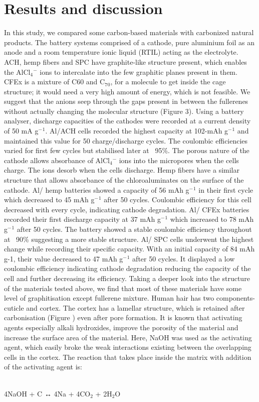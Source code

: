 \documentclass{article}
\begin{document}
\section{Results and discussion}

In this study, we compared some carbon-based materials with carbonized natural products. The battery systems comprised of a cathode, pure aluminium foil as an anode and a room temperature ionic liquid (RTIL) acting as the electrolyte. ACH, hemp fibers and SPC have graphite-like structure present, which enables the AlCl$_4{^-}$ ions to intercalate into the few graphitic planes present in them. CFEx is a mixture of C60 and C$_7{_0}$, for a molecule to get inside the cage structure; it would need a very high amount of energy, which is not feasible. We suggest that the anions seep through the gaps present in between the fullerenes without actually changing the molecular structure (Figure 3). 
Using a battery analyser, discharge capacities of the cathodes were recorded at a current density of 50 mA g$^-{^1}$. Al/ACH cells recorded the highest capacity at 102-mAh g$^-{^1}$ and maintained this value for 50 charge/discharge cycles. The coulombic efficiencies varied for first few cycles but stabilised later at ~95\%. The porous nature of the cathode allows absorbance of AlCl$_4{^-}$ ions into the micropores when the cells charge. The ions desorb when the cells discharge. Hemp fibers have a similar structure that allows absorbance of the chloroaluminates on the surface of the cathode. Al/ hemp batteries showed a capacity of 56 mAh g$^-{^1}$ in their first cycle which decreased to 45 mAh g$^-{^1}$ after 50 cycles. Coulombic efficiency for this cell decreased with every cycle, indicating cathode degradation. Al/ CFEx batteries recorded their first discharge capacity at 37 mAh g$^-{^1}$ which increased to 78 mAh g$^-{^1}$ after 50 cycles. The battery showed a stable coulombic efficiency throughout at ~90\% suggesting a more stable structure. Al/ SPC cells underwent the highest change while recording their specific capacity. With an initial capacity of 84 mAh g-1, their value decreased to 47 mAh g$^-{^1}$ after 50 cycles.  It displayed a low coulombic efficiency indicating cathode degradation reducing the capacity of the cell and further decreasing its efficiency. 
Taking a deeper look into the structure of the materials tested above, we find that most of these materials have some level of graphitisation except fullerene mixture. Human hair has two components- cuticle and cortex. The cortex has a lamellar structure, which is retained after carbonisation (Figure ) even after pore formation. It is known that activating agents especially alkali hydroxides, improve the porosity of the material and increase the surface area of the material. Here, NaOH was used as the activating agent, which easily broke the weak interactions existing between the overlapping cells in the cortex. The reaction that takes place inside the matrix with addition of the activating agent is:
\begin{center}
    \\4NaOH + C ↔ 4Na + 4CO$_2$ + 2H$_2$O
\end{center}
\end{document}
